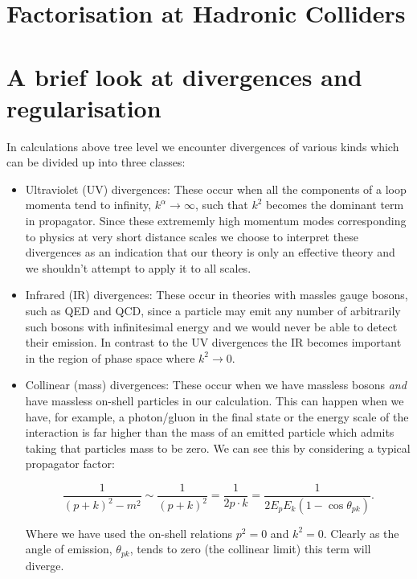 \section{Factorisation at Hadronic Colliders}

\section{A brief look at divergences and regularisation}

	In calculations above tree level we encounter divergences of various kinds which can be divided up into three classes:

	\begin{itemize}
	  \item Ultraviolet (UV) divergences:  These occur when all the components of a loop momenta tend to infinity, $k^\alpha\rightarrow\infty$, such that $k^2$ becomes the dominant term in propagator.  Since these extrememly high momentum modes corresponding to physics at very short distance scales we choose to 	interpret these divergences as an indication that our theory is only an effective theory and we shouldn't attempt to apply it to all scales.

	  \item Infrared (IR) divergences:  These occur in theories with massles gauge bosons, such as QED and QCD, since a particle may emit any number of arbitrarily such bosons with infinitesimal energy and we would never be able to detect their emission.  In contrast to the UV divergences the IR becomes important 	in the region of phase space where $k^2\rightarrow0$.

	  \item Collinear (mass) divergences: These occur when we have massless bosons \emph{and} have massless on-shell particles in our calculation.  This can happen when we have, for example, a photon/gluon in the final state or the energy scale of the interaction is far higher than the mass of an emitted particle 	which admits taking that particles mass to be zero.  We can see this by considering a typical propagator factor:

	  \begin{equation}
	  \frac{1}{(p+k)^2-m^2}\sim\frac{1}{(p+k)^2} = \frac{1}{2p\cdot k} = \frac{1}{2E_pE_k(1-\cos\theta_{pk})}.
	  \end{equation}

	  Where we have used the on-shell relations $p^2=0$ and $k^2=0$.  Clearly as the angle of emission, $\theta_{pk}$, tends to zero (the collinear limit) this term will diverge.
	\end{itemize}

